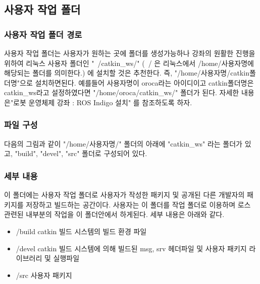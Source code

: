 \subsection{사용자 작업 폴더}

\subsubsection{사용자 작업 폴더 경로}

사용자 작업 폴더는 사용자가 원하는 곳에 폴더를 생성가능하나 강좌의 원활한 진행을 위하여 리눅스 사용자 폴더인 "~/catkin\_ws/" (~/ 은 리눅스에서 /home/사용자명에 해당되는 폴더를 의미한다.) 에 설치할 것은 추천한다. 즉, "/home/사용자명/catkin폴더명"으로 설치하면된다. 예를들어 사용자명이 oroca라는 아이디이고 catkin폴더명은 catkin\_ws라고 설정하였다면 "/home/oroca/catkin\_ws/" 폴더가 된다. 자세한 내용은"로봇 운영체제 강좌 : ROS Indigo 설치" 를 참조하도록 하자. 

\subsubsection{파일 구성}

다음의 그림과 같이 "/home/사용자명/" 폴더의 아래에 "catkin\_ws" 라는 폴더가 있고, "build", "devel", "src" 폴더로 구성되어 있다. 

\subsubsection{세부 내용}

이 폴더에는 사용자 작업 폴더로 사용자가 작성한 패키지 및 공개된 다른 개발자의 패키지를 저장하고 빌드하는 공간이다. 사용자는 이 폴더를 작업 폴더로 이용하며 로스 관련된 내부분의 작업을 이 폴더안에서 하게된다. 세부 내용은 아래와 같다.

\begin{itemize}
\item /build catkin 빌드 시스템의 빌드 환경 파일
\item /devel catkin 빌드 시스템에 의해 빌드된 msg, srv 헤더파일 및 사용자 패키지 라이브러리 및 실행파일
\item /src 사용자 패키지
\end{itemize}

